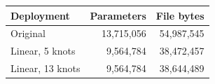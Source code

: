 \begin{tabular}{lrr}
\toprule
Deployment & Parameters & File bytes \\
\midrule
Original & 13,715,056 & 54,987,545 \\
Linear, 5 knots & 9,564,784 & 38,472,457 \\
Linear, 13 knots & 9,564,784 & 38,644,489 \\
\bottomrule
\end{tabular}
